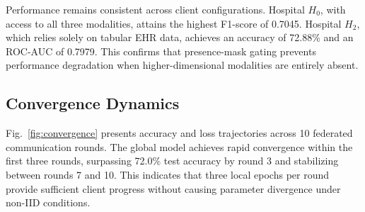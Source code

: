 \documentclass[10pt,conference]{IEEEtran}
\begin{document}
\begin{table}[!htbp]
\centering
\caption{Evaluation of the converged global federated model on local hospital partitions with heterogeneous modality access.}
\label{tab:hospital_metrics}
\end{table}

Performance remains consistent across client configurations. Hospital $H_0$, with access to all three modalities, attains the highest F1-score of 0.7045. Hospital $H_2$, which relies solely on tabular EHR data, achieves an accuracy of 72.88\% and an ROC-AUC of 0.7979. This confirms that presence-mask gating prevents performance degradation when higher-dimensional modalities are entirely absent.

\subsection{Convergence Dynamics}
Fig.~\ref{fig:convergence} presents accuracy and loss trajectories across 10 federated communication rounds. The global model achieves rapid convergence within the first three rounds, surpassing 72.0\% test accuracy by round 3 and stabilizing between rounds 7 and 10. This indicates that three local epochs per round provide sufficient client progress without causing parameter divergence under non-IID conditions.
\end{document}
